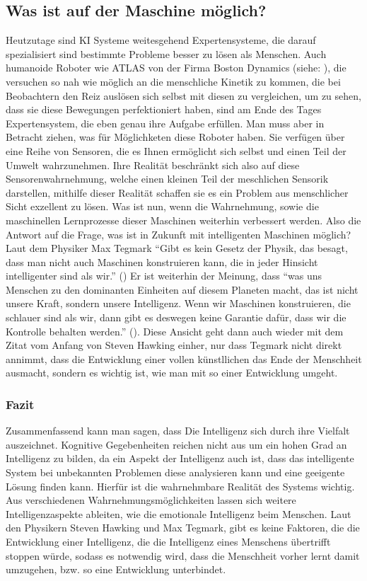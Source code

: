 \documentclass[a4paper, 11pt]{scrartcl}
\begin{document}
\subsection{Was ist auf der Maschine möglich?}
Heutzutage sind KI Systeme weitesgehend Expertensysteme, die darauf spezialisiert sind bestimmte Probleme besser zu lösen als Menschen. Auch humanoide Roboter wie ATLAS von der Firma Boston Dynamics (siehe: \cite{Atlas2019}), die versuchen so nah wie möglich an die menschliche Kinetik zu kommen, die bei Beobachtern den Reiz auslösen sich selbst mit diesen zu vergleichen, um zu sehen, dass sie diese Bewegungen perfektioniert haben, sind am Ende des Tages Expertensystem, die eben genau ihre Aufgabe erfüllen. Man muss aber in Betracht ziehen, was für Möglichketen diese Roboter haben. Sie verfügen über eine Reihe von Sensoren, die es Ihnen ermöglicht sich selbst und einen Teil der Umwelt wahrzunehmen. Ihre Realität beschränkt sich also auf diese Sensorenwahrnehmung, welche einen kleinen Teil der meschlichen Sensorik darstellen, mithilfe dieser Realität schaffen sie es ein Problem aus menschlicher Sicht exzellent zu lösen. Was ist nun, wenn die Wahrnehmung, sowie die maschinellen Lernprozesse dieser Maschinen weiterhin verbessert werden. Also die Antwort auf die Frage, was ist in Zukunft mit intelligenten Maschinen möglich? Laut dem Physiker Max Tegmark ``Gibt es kein Gesetz der Physik, das besagt, dass man nicht auch Maschinen konstruieren kann, die in jeder Hinsicht intelligenter sind als wir.'' (\cite{Tegmark2017}) Er ist weiterhin der Meinung, dass ``was uns Menschen zu den dominanten Einheiten auf diesem Planeten macht, das ist nicht unsere Kraft, sondern unsere Intelligenz. Wenn wir Maschinen konstruieren, die schlauer sind als wir, dann gibt es deswegen keine Garantie dafür, dass wir die Kontrolle behalten werden.'' (\cite{Tegmark2017}). Diese Ansicht geht dann auch wieder mit dem Zitat vom Anfang von Steven Hawking einher, nur dass Tegmark nicht direkt annimmt, dass die Entwicklung einer vollen künstllichen das Ende der Menschheit ausmacht, sondern es wichtig ist, wie man mit so einer Entwicklung umgeht.

\subsubsection{Fazit}
Zusammenfassend kann man sagen, dass Die Intelligenz sich durch ihre Vielfalt auszeichnet. Kognitive Gegebenheiten reichen nicht aus um ein hohen Grad an Intelligenz zu bilden, da ein Aspekt der Intelligenz auch ist, dass das intelligente System bei unbekannten Problemen diese analysieren kann und eine geeigente Lösung finden kann. Hierfür ist die wahrnehmbare Realität des Systems wichtig. Aus verschiedenen Wahrnehmungsmöglichkeiten lassen sich weitere Intelligenzaspekte ableiten, wie die emotionale Intelligenz beim Menschen. Laut den Physikern Steven Hawking und Max Tegmark, gibt es keine Faktoren, die die Entwicklung einer Intelligenz, die die Intelligenz eines Menschens übertrifft stoppen würde, sodass es notwendig wird, dass die Menschheit vorher lernt damit umzugehen, bzw. so eine Entwicklung unterbindet.
\end{document}
